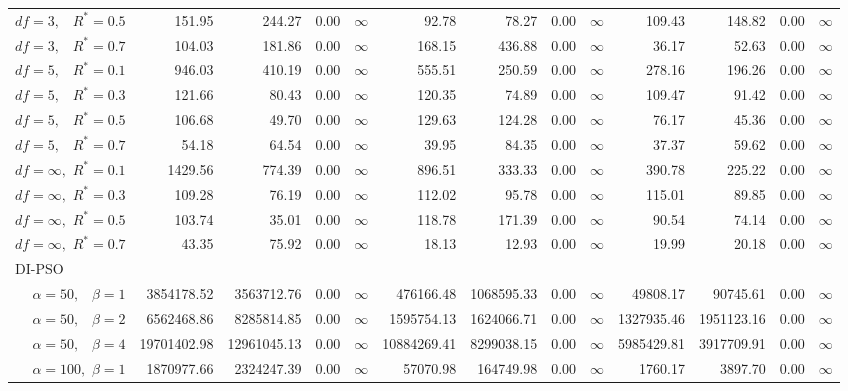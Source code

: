 \documentclass[12pt]{article}
\begin{document}
\begin{table}[ht]
{\begin{tabular}{r|rrrr|rrrr|rrrr}
  $df = 3,\enspace$ $R^* =0.5$ & 151.95 & 244.27 & 0.00 & $\infty$ & 92.78 & 78.27 & 0.00 & $\infty$ & 109.43 & 148.82 & 0.00 & $\infty$ \\ 
  $df = 3,\enspace$ $R^* =0.7$ & 104.03 & 181.86 & 0.00 & $\infty$ & 168.15 & 436.88 & 0.00 & $\infty$ & 36.17 & 52.63 & 0.00 & $\infty$ \\ 
  $df = 5,\enspace$ $R^* =0.1$ & 946.03 & 410.19 & 0.00 & $\infty$ & 555.51 & 250.59 & 0.00 & $\infty$ & 278.16 & 196.26 & 0.00 & $\infty$ \\ 
  $df = 5,\enspace$ $R^* =0.3$ & 121.66 & 80.43 & 0.00 & $\infty$ & 120.35 & 74.89 & 0.00 & $\infty$ & 109.47 & 91.42 & 0.00 & $\infty$ \\ 
  $df = 5,\enspace$ $R^* =0.5$ & 106.68 & 49.70 & 0.00 & $\infty$ & 129.63 & 124.28 & 0.00 & $\infty$ & 76.17 & 45.36 & 0.00 & $\infty$ \\ 
  $df = 5,\enspace$ $R^* =0.7$ & 54.18 & 64.54 & 0.00 & $\infty$ & 39.95 & 84.35 & 0.00 & $\infty$ & 37.37 & 59.62 & 0.00 & $\infty$ \\ 
  $df = \infty,$ $R^* =0.1$ & 1429.56 & 774.39 & 0.00 & $\infty$ & 896.51 & 333.33 & 0.00 & $\infty$ & 390.78 & 225.22 & 0.00 & $\infty$ \\ 
  $df = \infty,$ $R^* =0.3$ & 109.28 & 76.19 & 0.00 & $\infty$ & 112.02 & 95.78 & 0.00 & $\infty$ & 115.01 & 89.85 & 0.00 & $\infty$ \\ 
  $df = \infty,$ $R^* =0.5$ & 103.74 & 35.01 & 0.00 & $\infty$ & 118.78 & 171.39 & 0.00 & $\infty$ & 90.54 & 74.14 & 0.00 & $\infty$ \\ 
  $df = \infty,$ $R^* =0.7$ & 43.35 & 75.92 & 0.00 & $\infty$ & 18.13 & 12.93 & 0.00 & $\infty$ & 19.99 & 20.18 & 0.00 & $\infty$ \\ 
\hline
\multicolumn{1}{l|}{DI-PSO} &&&&&&&&&&&&\\
  $\alpha = 50,\enspace$ $\beta =1$ & 3854178.52 & 3563712.76 & 0.00 & $\infty$ & 476166.48 & 1068595.33 & 0.00 & $\infty$ & 49808.17 & 90745.61 & 0.00 & $\infty$ \\ 
  $\alpha = 50,\enspace$ $\beta =2$ & 6562468.86 & 8285814.85 & 0.00 & $\infty$ & 1595754.13 & 1624066.71 & 0.00 & $\infty$ & 1327935.46 & 1951123.16 & 0.00 & $\infty$ \\ 
  $\alpha = 50,\enspace$ $\beta =4$ & 19701402.98 & 12961045.13 & 0.00 & $\infty$ & 10884269.41 & 8299038.15 & 0.00 & $\infty$ & 5985429.81 & 3917709.91 & 0.00 & $\infty$ \\ 
  $\alpha = 100,$ $\beta =1$ & 1870977.66 & 2324247.39 & 0.00 & $\infty$ & 57070.98 & 164749.98 & 0.00 & $\infty$ & 1760.17 & 3897.70 & 0.00 & $\infty$ \\ 

\end{tabular}}
\end{table}
\end{document}
